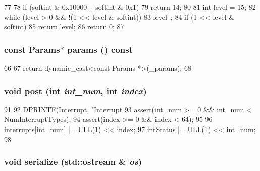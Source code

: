\begin{DoxyCode}
77     {
78         if (softint & 0x10000 || softint & 0x1)
79             return 14;
80 
81         int level = 15;
82         while (level > 0 && !(1 << level & softint))
83             level--;
84         if (1 << level & softint)
85             return level;
86         return 0;
87     }
\end{DoxyCode}
\hypertarget{classSparcISA_1_1Interrupts_acd3c3feb78ae7a8f88fe0f110a718dff}{
\subsubsection[{params}]{\setlength{\rightskip}{0pt plus 5cm}const {\bf Params}$\ast$ params () const}}
\label{classSparcISA_1_1Interrupts_acd3c3feb78ae7a8f88fe0f110a718dff}



\begin{DoxyCode}
66     {
67         return dynamic_cast<const Params *>(_params);
68     }
\end{DoxyCode}
\hypertarget{classSparcISA_1_1Interrupts_a24c6c4fbdc0605bcd015ce06f194e4b4}{
\subsubsection[{post}]{\setlength{\rightskip}{0pt plus 5cm}void post (int {\em int\_\-num}, \/  int {\em index})}}
\label{classSparcISA_1_1Interrupts_a24c6c4fbdc0605bcd015ce06f194e4b4}



\begin{DoxyCode}
91     {
92         DPRINTF(Interrupt, "Interrupt %
93         assert(int_num >= 0 && int_num < NumInterruptTypes);
94         assert(index >= 0 && index < 64);
95 
96         interrupts[int_num] |= ULL(1) << index;
97         intStatus |= ULL(1) << int_num;
98     }
\end{DoxyCode}
\hypertarget{classSparcISA_1_1Interrupts_a53e036786d17361be4c7320d39c99b84}{
\subsubsection[{serialize}]{\setlength{\rightskip}{0pt plus 5cm}void serialize (std::ostream \& {\em os})}}
\label{classSparcISA_1_1Interrupts_a53e036786d17361be4c7320d39c99b84}



